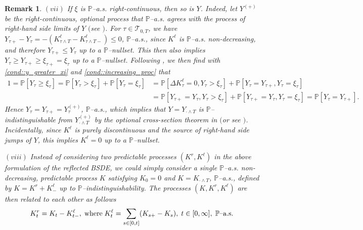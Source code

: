 \documentclass[10pt]{article} %
\newtheorem{remark}[theorem]{Remark}
\newcommand\cT{\mathcal T}
\def \P{\mathbb{P}}
\newcommand{\1}{\mathbf{1}}
\begin{document}
\begin{remark}
	\medskip
	$(vii)$ If $\xi$ is $\P${\rm--a.s.} right-continuous, then so is $Y$. Indeed, let $Y^{(+)}$ be the right-continuous, optional process that {\rm$\P$--a.s.} agrees with the process of right-hand side limits of $Y$ $($see {\rm\cite[Appendix I, Remark 5(b)]{dellacherie1982probabilities}}$)$. For $\tau \in \cT_{0,T}$, we have $Y_{\tau+} - Y_\tau = -( K^\ell_{\tau \land T} - K^\ell_{{\tau \land T}-}) \leq 0$, {\rm$\P$--a.s.}, since $K^\ell$ is {$\P$--a.s.} non-decreasing, and therefore $Y_{\tau+} \leq Y_\tau$ up to a {\rm$\P$--nullset}. This then also implies $Y_\tau \geq Y_{\tau+} \geq \xi_{\tau+} = \xi_\tau$ up to a {\rm$\P$--nullset}. Following {\rm\cite[Remark 3.3]{grigorova2017reflected}}, we then find with \ref{cond::y_greater_xi} and \ref{cond::increasing_proc} that 
		\begin{align*}
			1 = \P[Y_\tau \geq \xi_\tau] = \P[Y_\tau > \xi_\tau] + \P[Y_\tau = \xi_\tau] &= \P[\Delta K^\ell_\tau = 0, Y_\tau > \xi_\tau] + \P[Y_\tau = Y_{\tau+},Y_\tau = \xi_\tau] \\
			&= \P[Y_{\tau+} = Y_\tau, Y_\tau > \xi_\tau] + \P[Y_{\tau+} = Y_\tau, Y_\tau = \xi_\tau] = \P[Y_\tau=Y_{\tau+}].
		\end{align*}
		Hence $Y_\tau = Y_{\tau+} = Y^{(+)}_\tau$, $\P${\rm--a.s.}, which implies that $Y = Y_{\cdot\land T}$ is $\P$--indistinguishable from $Y^{(+)}_{\cdot\land T}$ by the optional cross-section theorem in {\rm\cite[Theorem IV.84, p. 137]{dellacherie1978probabilities}} $($or see {\rm{}}$)$. Incidentally, since $K^\ell$ is purely discontinuous and the source of right-hand side jumps of $Y$, this implies $K^\ell = 0$ up to a {\rm$\P$--nullset}.
		
	\medskip
	$(viii)$ Instead of considering two predictable processes $(K^r,K^\ell)$ in the above formulation of the reflected {\rm BSDE}, we could simply consider a single $\P$--{\rm a.s.} non-decreasing, predictable process $K$  satisfying $K_0 = 0$ and $K = K_{\cdot \land T}$, $\P$--{\rm a.s.}, defined by $K = K^r + K^\ell_-$ up to $\P$--indistinguishability. The processes $(K,K^r,K^\ell)$ are then related to each other as follows
		\begin{equation*}
			K^r_t = K_t- K^\ell_{t-}, \; \text{\rm where} \; K^\ell_t = \sum_{s \in [0,t]} (K_{s+} - K_s), \; t \in [0,\infty], \; \text{$\P$\rm--a.s.}
		\end{equation*}
\end{remark}
\end{document}
